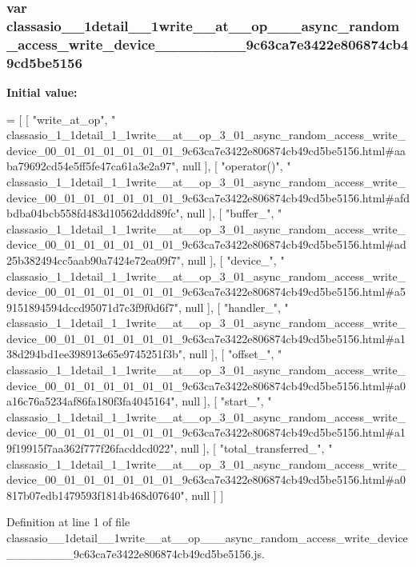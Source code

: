 \subsubsection[{classasio\+\_\+1\+\_\+1detail\+\_\+1\+\_\+1write\+\_\+\+\_\+at\+\_\+\+\_\+op\+\_\+3\+\_\+01\+\_\+async\+\_\+random\+\_\+access\+\_\+write\+\_\+device\+\_\+00\+\_\+01\+\_\+01\+\_\+01\+\_\+01\+\_\+01\+\_\+01\+\_\+9c63ca7e3422e806874cb49cd5be5156}]{\setlength{\rightskip}{0pt plus 5cm}var classasio\+\_\+\_\+1detail\+\_\+\_\+1write\+\_\+\+\_\+at\+\_\+\+\_\+op\+\_\+\_\+\_\+async\+\_\+random\+\_\+access\+\_\+write\+\_\+device\+\_\+\_\+\_\+\_\+\_\+\_\+\_\+\_\+9c63ca7e3422e806874cb49cd5be5156}\label{classasio__1__1detail__1__1write____at____op__3__01__async__random__access__write__device__00__05208cc6a534f24359bd151b3aa0cb777_abe61023bf97f82fd215c4eedac8c6544}
{\bfseries Initial value\+:}
\begin{DoxyCode}
=
[
    [ \textcolor{stringliteral}{"write\_at\_op"}, \textcolor{stringliteral}{"
      classasio\_1\_1detail\_1\_1write\_\_at\_\_op\_3\_01\_async\_random\_access\_write\_device\_00\_01\_01\_01\_01\_01\_01\_9c63ca7e3422e806874cb49cd5be5156.html#aaba79692cd54e5ff5fe47ca61a3e2a97"}, null ],
    [ \textcolor{stringliteral}{"operator()"}, \textcolor{stringliteral}{"
      classasio\_1\_1detail\_1\_1write\_\_at\_\_op\_3\_01\_async\_random\_access\_write\_device\_00\_01\_01\_01\_01\_01\_01\_9c63ca7e3422e806874cb49cd5be5156.html#afdbdba04bcb558fd483d10562ddd89fc"}, null ],
    [ \textcolor{stringliteral}{"buffer\_"}, \textcolor{stringliteral}{"
      classasio\_1\_1detail\_1\_1write\_\_at\_\_op\_3\_01\_async\_random\_access\_write\_device\_00\_01\_01\_01\_01\_01\_01\_9c63ca7e3422e806874cb49cd5be5156.html#ad25b382494cc5aab90a7424e72ea09f7"}, null ],
    [ \textcolor{stringliteral}{"device\_"}, \textcolor{stringliteral}{"
      classasio\_1\_1detail\_1\_1write\_\_at\_\_op\_3\_01\_async\_random\_access\_write\_device\_00\_01\_01\_01\_01\_01\_01\_9c63ca7e3422e806874cb49cd5be5156.html#a59151894594dccd95071d7c3f9f0d6f7"}, null ],
    [ \textcolor{stringliteral}{"handler\_"}, \textcolor{stringliteral}{"
      classasio\_1\_1detail\_1\_1write\_\_at\_\_op\_3\_01\_async\_random\_access\_write\_device\_00\_01\_01\_01\_01\_01\_01\_9c63ca7e3422e806874cb49cd5be5156.html#a138d294bd1ee398913e65e9745251f3b"}, null ],
    [ \textcolor{stringliteral}{"offset\_"}, \textcolor{stringliteral}{"
      classasio\_1\_1detail\_1\_1write\_\_at\_\_op\_3\_01\_async\_random\_access\_write\_device\_00\_01\_01\_01\_01\_01\_01\_9c63ca7e3422e806874cb49cd5be5156.html#a0a16c76a5234af86fa180f3fa4045164"}, null ],
    [ \textcolor{stringliteral}{"start\_"}, \textcolor{stringliteral}{"
      classasio\_1\_1detail\_1\_1write\_\_at\_\_op\_3\_01\_async\_random\_access\_write\_device\_00\_01\_01\_01\_01\_01\_01\_9c63ca7e3422e806874cb49cd5be5156.html#a19f19915f7aa362f777f26facddcd022"}, null ],
    [ \textcolor{stringliteral}{"total\_transferred\_"}, \textcolor{stringliteral}{"
      classasio\_1\_1detail\_1\_1write\_\_at\_\_op\_3\_01\_async\_random\_access\_write\_device\_00\_01\_01\_01\_01\_01\_01\_9c63ca7e3422e806874cb49cd5be5156.html#a0817b07edb1479593f1814b468d07640"}, null ]
]
\end{DoxyCode}


Definition at line 1 of file classasio\+\_\+\_\+1detail\+\_\+\_\+1write\+\_\+\+\_\+at\+\_\+\+\_\+op\+\_\+\_\+\_\+async\+\_\+random\+\_\+access\+\_\+write\+\_\+device\+\_\+\_\+\_\+\_\+\_\+\_\+\_\+\_\+9c63ca7e3422e806874cb49cd5be5156.\+js.

